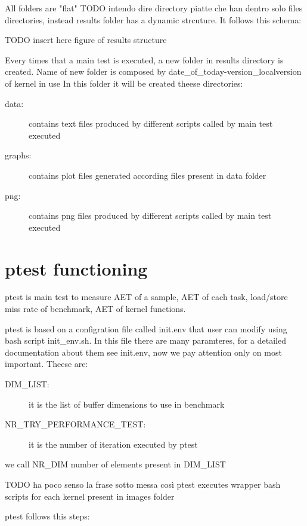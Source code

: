 \documentclass[a4paper,10pt]{article}
\begin{document}
\begin{multicols}{2}
All folders are "flat" TODO intendo dire directory piatte che han dentro solo files
directories, instead results folder has a dynamic strcuture. It follows this schema:

TODO insert here figure of results structure

Every times that a main test is executed, a new folder in results directory is created.
Name of new folder is composed by date\_of\_today-version\_localversion of kernel in use
In this folder it will be created theese directories:

\begin{description}
	\item[data:] contains text files produced by different scripts called by main test executed
	\item[graphs:] contains plot files generated according files present in data folder
	\item[png:] contains png files produced by different scripts called by main test executed
\end{description}

\section{ptest functioning}

ptest is main test to measure AET of a sample, AET of each task, load/store 
miss rate of benchmark, AET of kernel functions.

ptest is based on a configration file called init.env that user can modify using 
bash script init\_env.sh. In this file there are many paramteres, for a detailed
documentation about them see init.env, now we pay attention only on most important.
Theese are:

\begin{description}
	\item[DIM\_LIST:] it is the list of buffer dimensions to use in benchmark
	\item[NR\_TRY\_PERFORMANCE\_TEST:] it is the number of iteration executed by ptest
\end{description}

we call NR\_DIM number of elements present in DIM\_LIST

TODO ha poco senso la frase sotto messa così
ptest executes wrapper bash scripts for each kernel present in images folder

ptest follows this steps:


\end{multicols}
\end{document}
